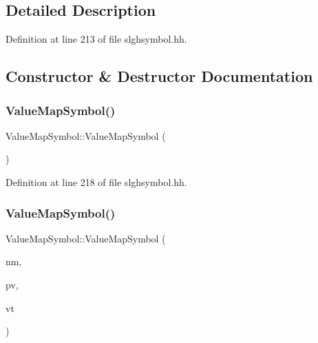\subsection{Detailed Description}


Definition at line 213 of file slghsymbol.\+hh.



\subsection{Constructor \& Destructor Documentation}
\mbox{\label{class_value_map_symbol_ad4f0eeb5f24d1859e90016d4807d3d31}} 
\subsubsection{\texorpdfstring{ValueMapSymbol()}{ValueMapSymbol()}\hspace{0.1cm}{\footnotesize\ttfamily [1/2]}}
{\footnotesize\ttfamily Value\+Map\+Symbol\+::\+Value\+Map\+Symbol (\begin{DoxyParamCaption}\item[{void}]{ }\end{DoxyParamCaption})\hspace{0.3cm}{\ttfamily [inline]}}



Definition at line 218 of file slghsymbol.\+hh.

\mbox{\label{class_value_map_symbol_a9dd3d3fd297fe8028dce8f357f0a57db}} 
\subsubsection{\texorpdfstring{ValueMapSymbol()}{ValueMapSymbol()}\hspace{0.1cm}{\footnotesize\ttfamily [2/2]}}
{\footnotesize\ttfamily Value\+Map\+Symbol\+::\+Value\+Map\+Symbol (\begin{DoxyParamCaption}\item[{const string \&}]{nm,  }\item[{\mbox{\hyperlink{class_pattern_value}{Pattern\+Value}} $\ast$}]{pv,  }\item[{const vector$<$ \mbox{\hyperlink{types_8h_aa925ba3e627c2df89d5b1cfe84fb8572}{intb}} $>$ \&}]{vt }\end{DoxyParamCaption})\hspace{0.3cm}{\ttfamily [inline]}}



